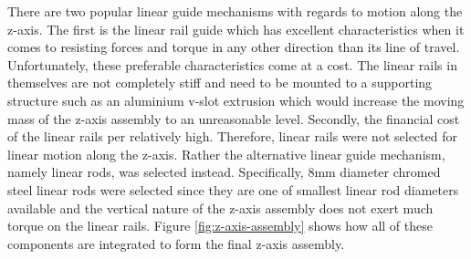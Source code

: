 There are two popular linear guide mechanisms with regards to motion along the z-axis. The first is the linear rail guide which has excellent characteristics when it comes to resisting forces and torque in any other direction than its line of travel. Unfortunately, these preferable characteristics come at a cost. The linear rails in themselves are not completely stiff and need to be mounted to a supporting structure such as an aluminium v-slot extrusion which would increase the moving mass of the z-axis assembly to an unreasonable level. Secondly, the financial cost of the linear rails per relatively high. Therefore, linear rails were not selected for linear motion along the z-axis. Rather the alternative linear guide mechanism, namely linear rods, was selected instead. Specifically, 8mm diameter chromed steel linear rods were selected since they are one of smallest linear rod diameters available and the vertical nature of the z-axis assembly does not exert much torque on the linear rails. Figure \ref{fig:z-axis-assembly} shows how all of these components are integrated to form the final z-axis assembly.
%
%
%



